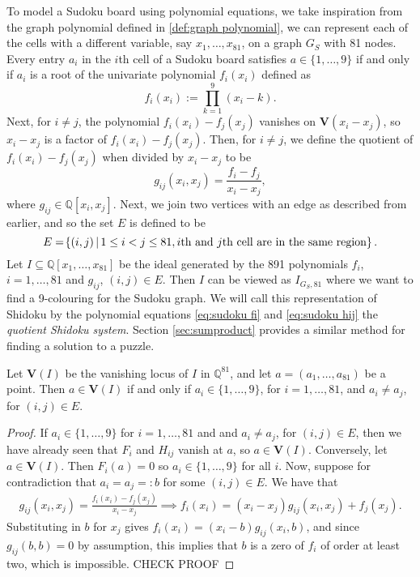 \documentclass[../main.tex]{subfiles}
\begin{document}
        To model a Sudoku board using polynomial equations, we take inspiration from the graph polynomial defined in \ref{def:graph polynomial}, we can represent each of the cells with a different variable, say $x_1,\dots,x_{81}$, on a graph $G_S$ with 81 nodes. Every entry $a_i$ in the $i$th cell of a Sudoku board satisfies $a\in \{1,\dots,9\}$ if and only if $a_i$ is a root of the univariate polynomial $f_i(x_i)$ defined as 
        \begin{equation} \label{eq:sudoku fi}
            f_i(x_i) := \prod^9_{k=1}(x_i-k).
        \end{equation}
        Next, for $i\neq j$, the polynomial $f_i(x_i)-f_j(x_j)$ vanishes on $\mathbf{V}(x_i-x_j)$, so $x_i-x_j$ is a factor of $f_i(x_i)-f_j(x_j)$. Then, for $i\neq j$, we define the quotient of $f_i(x_i)-f_j(x_j)$ when divided by $x_i-x_j$ to be
        \begin{equation} \label{eq:sudoku hij}
            g_{ij} (x_i,x_j) = \frac{f_i-f_j}{x_i-x_j},
        \end{equation}
        where $g_{ij}\in \mathbb{Q}[x_i,x_j]$. Next, we join two vertices with an edge as described from earlier, and so the set $E$ is defined to be
        $$E = \lr\{\}{(i,j) \, | \, 1\leq i < j\leq 81, \text{$i$th and $j$th cell are in the same region}}.$$
        Let $I\subseteq\mathbb{Q}[x_1,\dots,x_{81}]$ be the ideal generated by the 891 polynomials $f_i$, $i=1,\dots,81$ and $g_{ij}$, $(i,j)\in E$. Then $I$ can be viewed as $I_{G_S,81}$ where we want to find a 9-colouring for the Sudoku graph. We will call this representation of Shidoku by the polynomial equations \ref{eq:sudoku fi} and \ref{eq:sudoku hij} the \emph{quotient Shidoku system}. Section \ref{sec:sumproduct} provides a similar method for finding a solution to a puzzle.

        \begin{proposition} \label{prop:solution}
            Let $\mathbf{V}(I)$ be the vanishing locus of $I$ in $\mathbb{Q}^{81}$, and let $a=(a_1,\dots,a_{81})$ be a point. Then $a\in \mathbf{V}(I)$ if and only if $a_i\in \{1,\dots,9\}$, for $i=1,\dots,81$, and $a_i\neq a_j$, for $(i,j)\in E$.
        \end{proposition}
        \begin{proof}
            If $a_i\in \{1,\dots,9\}$ for $i=1,\dots,81$ and and $a_i\neq a_j$, for $(i,j)\in E$, then we have already seen that $F_i$ and $H_{ij}$ vanish at $a$, so $a\in \mathbf{V}(I)$. Conversely, let $a\in \mathbf{V}(I)$. Then $F_i(a)=0$ so $a_i\in\{1,\dots,9\}$ for all $i$. Now, suppose for contradiction that $a_i=a_j=:b$ for some $(i,j)\in E$. 
            We have that 
            \begin{align*}
                g_{ij}(x_i,x_j) = \frac{f_i(x_i) -f_j(x_j)}{x_i-x_j} \implies f_i(x_i) = (x_i-x_j)g_{ij}(x_i,x_j) + f_j(x_j).
            \end{align*}
            Substituting in $b$ for $x_j$ gives $f_i(x_i)=(x_i-b)g_{ij}(x_i,b)$, and since $g_{ij}(b,b)=0$ by assumption, this implies that $b$ is a zero of $f_i$ of order at least two, which is impossible. {\color{red} CHECK PROOF}
        \end{proof}
\end{document}
